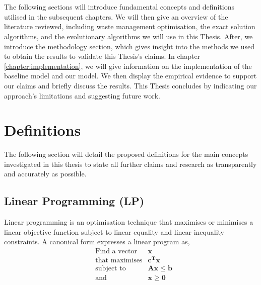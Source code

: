 \documentclass[mscthesis, 11pt]{usiinfthesis}
\theoremstyle{newdefinition}
\begin{document}
\\\\
The following sections will introduce fundamental concepts and definitions utilised in the subsequent chapters. We will then give an overview of the literature reviewed, including waste management optimisation, the exact solution algorithms, and the evolutionary algorithms we will use in this Thesis. After, we introduce the methodology section, which gives insight into the methods we used to obtain the results to validate this Thesis's claims. In chapter \ref{chapter:implementation}, we will give information on the implementation of the baseline model and our model. We then display the empirical evidence to support our claims and briefly discuss the results. This Thesis concludes by indicating our approach's limitations and suggesting future work.

\section{Definitions}
The following section will detail the proposed definitions for the main concepts investigated in this thesis to state all further claims and research as transparently and accurately as possible.
\subsection{Linear Programming (LP)}
Linear programming is an optimisation technique that maximises or minimises a linear objective function subject to linear equality and linear inequality constraints.
A canonical form expresses a linear program as,
\begin{equation*}
\begin{aligned}
    &\text{Find a vector} &\mathbf{x} \\
    &\text{that maximises} &\mathbf{c^T x} \\
    &\text{subject to} &\mathbf{Ax} \leq \mathbf{b} \\
    &\text{and} &\mathbf{x} \geq \mathbf{0} \\
\end{aligned}
\end{equation*}
\clearpage
\end{document}
